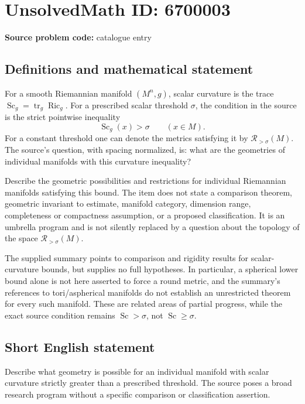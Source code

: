 \documentclass[11pt]{article}
\begin{document}
\section*{UnsolvedMath ID: 6700003}
\textbf{Source problem code:} catalogue entry
\subsection{Definitions and mathematical statement}
For a smooth Riemannian manifold $(M^n,g)$, scalar curvature is the trace $\operatorname{Sc}_g=\operatorname{tr}_g\operatorname{Ric}_g$. For a prescribed scalar threshold $\sigma$, the condition in the source is the strict pointwise inequality
\[
\operatorname{Sc}_g(x)>\sigma\qquad(x\in M).
\]
For a constant threshold one can denote the metrics satisfying it by $\mathcal R_{>\sigma}(M)$. The source's question, with spacing normalized, is: what are the geometries of individual manifolds with this curvature inequality?

Describe the geometric possibilities and restrictions for individual Riemannian manifolds satisfying this bound. The item does not state a comparison theorem, geometric invariant to estimate, manifold category, dimension range, completeness or compactness assumption, or a proposed classification. It is an umbrella program and is not silently replaced by a question about the topology of the space $\mathcal R_{>\sigma}(M)$.

The supplied summary points to comparison and rigidity results for scalar-curvature bounds, but supplies no full hypotheses. In particular, a spherical lower bound alone is not here asserted to force a round metric, and the summary's references to tori/aspherical manifolds do not establish an unrestricted theorem for every such manifold. These are related areas of partial progress, while the exact source condition remains $\operatorname{Sc}>\sigma$, not $\operatorname{Sc}\geq\sigma$.
\subsection{Short English statement}
Describe what geometry is possible for an individual manifold with scalar curvature strictly greater than a prescribed threshold. The source poses a broad research program without a specific comparison or classification assertion.
\end{document}
